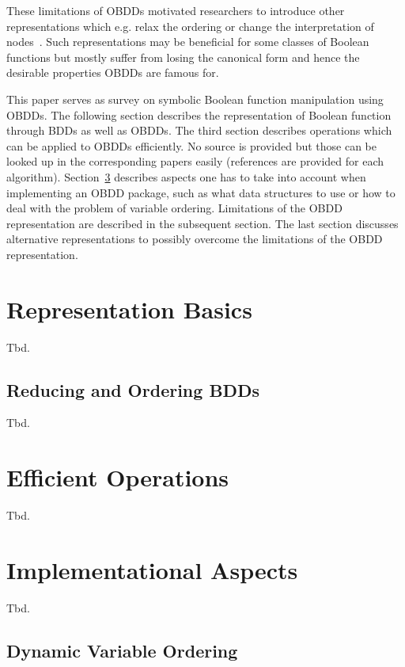 \documentclass{vldb}
\begin{document}
These limitations of OBDDs motivated researchers to introduce other
representations which e.g. relax the ordering or change the interpretation of
nodes~\cite{BRYANT95}. Such representations may be beneficial for some classes
of Boolean functions but mostly suffer from losing the canonical form and hence
the desirable properties OBDDs are famous for.

This paper serves as survey on symbolic Boolean function manipulation using OBDDs.
The following section describes the representation of Boolean function through
BDDs as well as OBDDs. The third section describes operations which can be applied
to OBDDs efficiently. No source is provided but those can be looked up in the
corresponding papers easily (references are provided for each algorithm).
Section~\ref{sec:implementation-aspects} describes aspects one has to take into
account when implementing an OBDD package, such as what data structures to use
or how to deal with the problem of variable ordering. Limitations of the OBDD
representation are described in the subsequent section. The last section
discusses alternative representations to possibly overcome the limitations of
the OBDD representation.

\section{Representation Basics}
\label{sec:representation-basics}

Tbd.

\subsection{Reducing and Ordering BDDs}
\label{subsec:reducing-and-ordering-bdds}

Tbd.

\section{Efficient Operations}
\label{sec:efficient-operations}

Tbd.

\section{Implementational Aspects}
\label{sec:implementation-aspects}

Tbd.

\subsection{Dynamic Variable Ordering}
\label{subsec:dynamic-variable-ordering}
\end{document}

